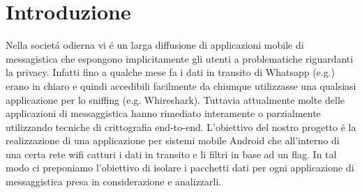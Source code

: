 \documentclass[12pt]{article} %
\begin{document}

\tableofcontents %

\newpage %


\section{Introduzione} %

Nella societ\'a odierna vi \'e un larga diffusione di applicazioni mobile di messagistica che espongono implicitamente gli utenti a problematiche riguardanti la privacy. Infatti fino a qualche mese fa i dati in transito di Whatsapp (e.g.) erano in chiaro e quindi accedibili facilmente da chiunque utilizzasse una qualsiasi applicazione per lo sniffing (e.g. Whireshark). Tuttavia attualmente molte delle applicazioni di messaggistica hanno rimediato interamente o parzialmente utilizzando tecniche di crittografia end-to-end. 
L'obiettivo del nostro progetto \'e la realizzazione di una applicazione per sistemi mobile Android che all'interno di una certa rete wifi catturi i dati in transito e li filtri in base ad un flag. In tal modo ci preponiamo l'obiettivo di isolare i pacchetti dati per ogni applicazione di messaggistica presa in considerazione e analizzarli.
 





\end{document}
